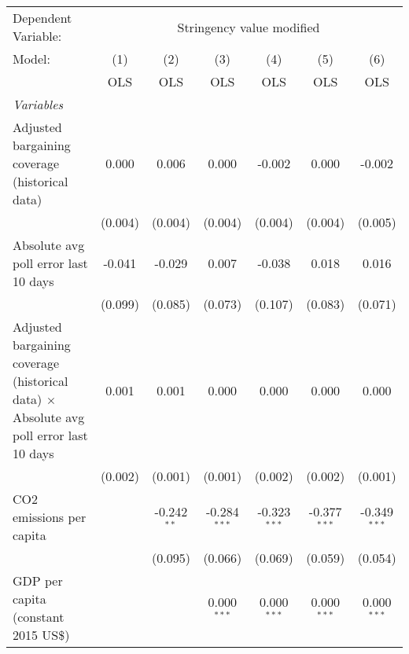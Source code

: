 
\begingroup
\centering
\begin{tabular}{lcccccc}
   \toprule
   Dependent Variable: & \multicolumn{6}{c}{Stringency value modified}\\
   Model:                                                                                        & (1)     & (2)           & (3)            & (4)            & (5)            & (6)\\  
                                                                                                 &  OLS    & OLS           & OLS            & OLS            & OLS            & OLS\\  
   \midrule
   \emph{Variables}\\
   Adjusted bargaining coverage (historical data)                                                & 0.000   & 0.006         & 0.000          & -0.002         & 0.000          & -0.002\\   
                                                                                                 & (0.004) & (0.004)       & (0.004)        & (0.004)        & (0.004)        & (0.005)\\   
   Absolute avg poll error last 10 days                                                          & -0.041  & -0.029        & 0.007          & -0.038         & 0.018          & 0.016\\   
                                                                                                 & (0.099) & (0.085)       & (0.073)        & (0.107)        & (0.083)        & (0.071)\\   
   Adjusted bargaining coverage (historical data) $\times$ Absolute avg poll error last 10 days  & 0.001   & 0.001         & 0.000          & 0.000          & 0.000          & 0.000\\   
                                                                                                 & (0.002) & (0.001)       & (0.001)        & (0.002)        & (0.002)        & (0.001)\\   
   CO2 emissions per capita                                                                      &         & -0.242$^{**}$ & -0.284$^{***}$ & -0.323$^{***}$ & -0.377$^{***}$ & -0.349$^{***}$\\   
                                                                                                 &         & (0.095)       & (0.066)        & (0.069)        & (0.059)        & (0.054)\\   
   GDP per capita (constant 2015 US\$)                                                           &         &               & 0.000$^{***}$  & 0.000$^{***}$  & 0.000$^{***}$  & 0.000$^{***}$\\   

\end{tabular}
